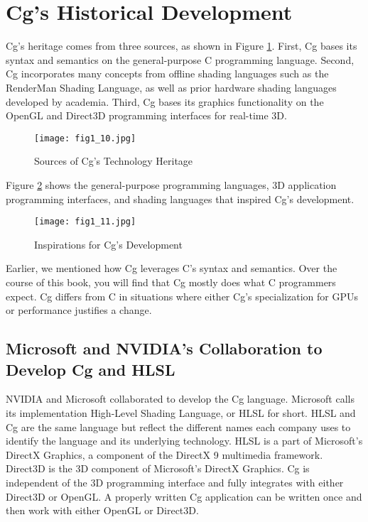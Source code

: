 \documentclass[../main.tex]{subfiles}
\begin{document}
\section{Cg's Historical Development}

Cg's heritage comes from three sources, as shown in Figure \ref{fig:1-10}. First, Cg bases its syntax and semantics on the general-purpose C programming language. Second, Cg incorporates many concepts from offline shading languages such as the RenderMan Shading Language, as well as prior hardware shading languages developed by academia. Third, Cg bases its graphics functionality on the OpenGL and Direct3D programming interfaces for real-time 3D.

\begin{figure}
    \centering
    \texttt{[image: fig1\_10.jpg]}
    \caption{Sources of Cg's Technology Heritage}
    \label{fig:1-10}
\end{figure}

Figure \ref{fig:1-11} shows the general-purpose programming languages, 3D application programming interfaces, and shading languages that inspired Cg's development.

\begin{figure}
    \centering
    \texttt{[image: fig1\_11.jpg]}
    \caption{Inspirations for Cg's Development}
    \label{fig:1-11}
\end{figure}

Earlier, we mentioned how Cg leverages C's syntax and semantics. Over the course of this book, you will find that Cg mostly does what C programmers expect. Cg differs from C in situations where either Cg's specialization for GPUs or performance justifies a change.

\subsection{Microsoft and NVIDIA's Collaboration to Develop Cg and HLSL}

NVIDIA and Microsoft collaborated to develop the Cg language. Microsoft calls its implementation High-Level Shading Language, or HLSL for short. HLSL and Cg are the same language but reflect the different names each company uses to identify the language and its underlying technology. HLSL is a part of Microsoft's DirectX Graphics, a component of the DirectX 9 multimedia framework. Direct3D is the 3D component of Microsoft's DirectX Graphics. Cg is independent of the 3D programming interface and fully integrates with either Direct3D or OpenGL. A properly written Cg application can be written once and then work with either OpenGL or Direct3D.
\end{document}
